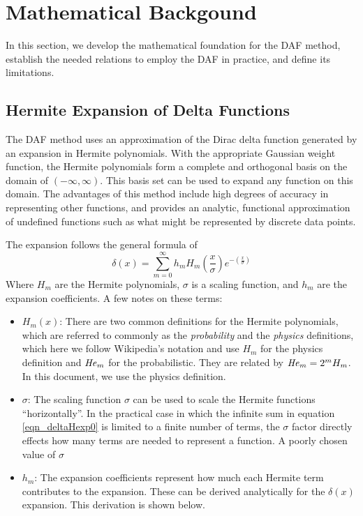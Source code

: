 \documentclass[preprint]{revtex4}
\begin{document}

\section{Mathematical Backgound}
In this section, we develop the mathematical foundation for the DAF method, establish 
the needed relations to employ the DAF in practice, and define its limitations. 

\subsection{Hermite Expansion of Delta Functions}
The DAF method uses an approximation of the Dirac delta function generated by 
an expansion in Hermite polynomials. With the appropriate Gaussian weight function, 
the Hermite polynomials form a complete and orthogonal basis on the domain of 
$(-\infty,\infty)$. 
This basis set can be used to expand any function on this domain. The advantages
of this method include high degrees of accuracy in representing other functions, 
and provides an analytic, functional approximation of undefined functions such as 
what might be represented by discrete data points. 

The expansion follows the general formula\cite{HermiteWiki} of 
\begin{equation}
\label{eqn_deltaHexp0}
\delta(x) = \sum_{m=0}^\infty h_m H_m\left(\frac{x}{\sigma}\right) e^{-\left(\frac{x}{\sigma}\right)}
\end{equation}
Where $H_m$ are the Hermite polynomials, $\sigma$ is a scaling function, and $h_m$ are the
expansion coefficients. A few notes on these terms: 
\begin{itemize}
\item{$H_m(x)$}: There are two common definitions for the Hermite polynomials, which are referred
to commonly as the {\it probability} and the {\it physics} definitions, which here we follow
Wikipedia's notation and use $H_m$ for the physics definition and ${\it He}_m$ for the probabilistic. 
They are related by ${\it He}_m = 2^m H_m$. In this document, we use the physics definition. 
\item{$\sigma$}: The scaling function $\sigma$ can be used to scale the Hermite functions 
``horizontally''. In the practical case in which the infinite sum in equation \ref{eqn_deltaHexp0}
is limited to a finite number of terms, the $\sigma$ factor directly effects how many terms
are needed to represent a function. A poorly chosen value of $\sigma$ 
\item{$h_m$}: The expansion coefficients represent how much each Hermite term contributes to the
expansion. These can be derived analytically for the $\delta(x)$ expansion.
This derivation is shown below. 
\end{itemize}
\end{document}
